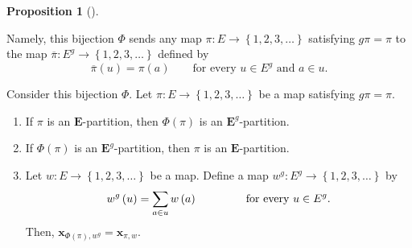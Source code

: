 \documentclass[numbers=enddot,12pt,final,onecolumn,notitlepage,abstracton]{scrartcl}
\theoremstyle{definition}
\newtheorem{prop}[theo]{Proposition}
\newenvironment{proposition}[1][]
{\begin{prop}[#1]\begin{leftbar}}
{\end{leftbar}\end{prop}}
\let\sumnonlimits\sum
\renewcommand{\sum}{\sumnonlimits\limits}
\newenvironment{verlong}{}{}
\newcommand{\xx}{{\mathbf{x}}}
\newcommand{\EE}{{\mathbf{E}}}
\begin{document}
\begin{proposition}
\begin{verlong}
Namely, this bijection $\Phi$ sends any map
$\pi:E\rightarrow\left\{  1,2,3,\ldots \right\}  $ satisfying $g\pi=\pi$
to the map $\overline{\pi}:E^{g}
\rightarrow\left\{  1,2,3,\ldots\right\}  $ defined by
\[
\overline{\pi}\left( u \right)
= \pi\left( a \right)
\qquad\text{for every } u \in E^{g} \text{ and } a \in u.
\]
\end{verlong}

Consider this bijection $\Phi$. Let
$\pi:E\rightarrow\left\{  1,2,3,\ldots\right\}  $ be a
map satisfying $g\pi=\pi$.

\begin{enumerate}
\item[(a)] If $\pi$ is an $\EE$-partition, then $\Phi\left(
\pi\right)  $ is an $ \EE ^{g}$-partition.

\item[(b)] If $\Phi\left(  \pi\right)  $ is an
$\EE^{g}$-partition, then $\pi$ is an $\EE$-partition.

\item[(c)] Let $w : E \to \left\{1,2,3,\ldots\right\}$ be
a map. Define a map $w^{g}:E^{g}\rightarrow
\left\{1,2,3,\ldots\right\}$
by
\[
w^{g}\left(  u\right)  =\sum\limits_{a\in u}w\left(
a\right)  \qquad \qquad \text{ for every } u \in E^g .
\]
Then, $\xx_{\Phi\left(  \pi\right)  ,w^{g}}
=\xx_{\pi,w}$.

\end{enumerate}
\end{proposition}
\end{document}
